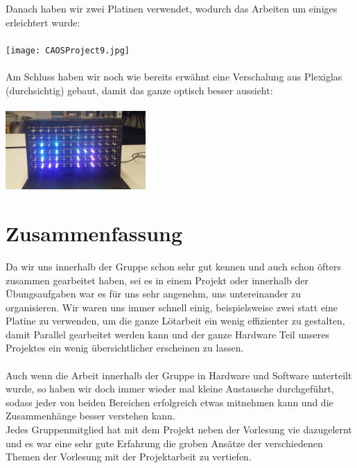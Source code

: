\documentclass[12pt,a4paper]{article}
\begin{document}
Danach haben wir zwei Platinen verwendet, wodurch das Arbeiten um einiges erleichtert wurde: \\\\
\texttt{[image: CAOSProject9.jpg]} \\\\

Am Schluss haben wir noch wie bereits erwähnt eine Verschalung aus Plexiglas (durchsichtig) gebaut, 
damit das ganze optisch besser aussieht: \\\\
\includegraphics[width=0.4\textwidth]{Endprod2.jpg}


\section{Zusammenfassung}

Da wir uns innerhalb der Gruppe schon sehr gut kennen und auch schon öfters zusammen gearbeitet haben, sei es in einem Projekt oder  innerhalb der Übungsaufgaben war es für uns sehr angenehm, uns untereinander zu organisieren. Wir waren uns immer schnell einig, beispielsweise zwei statt eine Platine zu verwenden, um die ganze Lötarbeit ein wenig effizienter zu gestalten, damit Parallel gearbeitet werden kann und der ganze Hardware Teil unseres Projektes ein wenig übersichtlicher erscheinen zu lassen. \\\\
Auch wenn die Arbeit innerhalb der Gruppe in Hardware und Software unterteilt wurde, so haben wir doch immer wieder mal kleine Austausche durchgeführt, sodass jeder von beiden Bereichen erfolgreich etwas mitnehmen kann und die Zusammenhänge besser verstehen kann.\\

Jedes Gruppenmitglied hat mit dem Projekt neben der Vorlesung vie dazugelernt und es war eine sehr gute Erfahrung die groben Ansätze
der verschiedenen Themen der Vorlesung mit der Projektarbeit zu vertiefen.


\newpage
\end{document}

